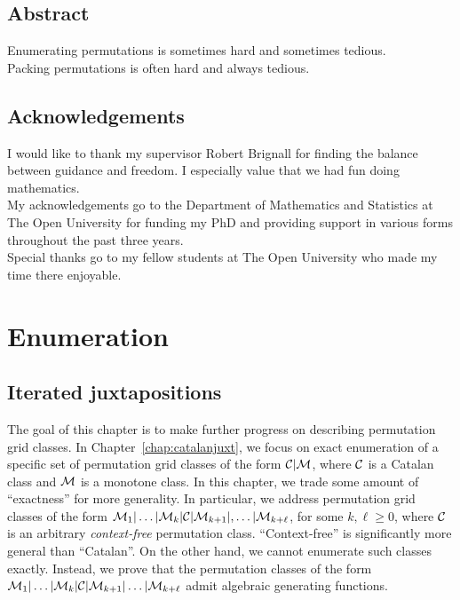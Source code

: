 \documentclass[12pt, a4paper, twoside]{report}
\begin{document}




\setcounter{secnumdepth}{-2}%
\chapter{Abstract}
Enumerating permutations is sometimes hard and sometimes tedious.\\
\noindent Packing permutations is often hard and always tedious.

\chapter{Acknowledgements}
I would like to thank my supervisor Robert Brignall for finding the balance between guidance and freedom. I especially value that we had fun doing mathematics.\\

My acknowledgements go to the Department of Mathematics and Statistics at The Open University for funding my PhD and providing support in various forms throughout the past three years.\\

Special thanks go to my fellow students at The Open University who made my time there enjoyable.
\setcounter{secnumdepth}{2}

\tableofcontents

\part{Enumeration}
%

\chapter{Iterated juxtapositions}

The goal of this chapter is to make further progress on describing permutation grid classes. In Chapter~\ref{chap:catalanjuxt}, we focus on exact enumeration of a specific set of permutation grid classes of the form $\mathcal{C}|\mathcal{M}$, where $\mathcal{C}$ is a Catalan class and $\mathcal{M}$ is a monotone class. In this chapter, we trade some amount of ``exactness'' for more generality. In particular, we address permutation grid classes of the form $\mathcal{M}_1|\ldots|\mathcal{M}_k|\mathcal{C}|\mathcal{M}_{k+1}|,\ldots|\mathcal{M}_{k+\ell}$, for some $k,\ell \geq 0$, where $\mathcal{C}$ is an arbitrary \emph{context-free} permutation class. ``Context-free'' is significantly more general than ``Catalan''. On the other hand, we cannot enumerate such classes exactly. Instead, we prove that the permutation classes of the form $\mathcal{M}_1|\ldots|\mathcal{M}_k|\mathcal{C}|\mathcal{M}_{k+1}|\ldots|\mathcal{M}_{k+\ell}$ admit algebraic generating functions.
\end{document}
